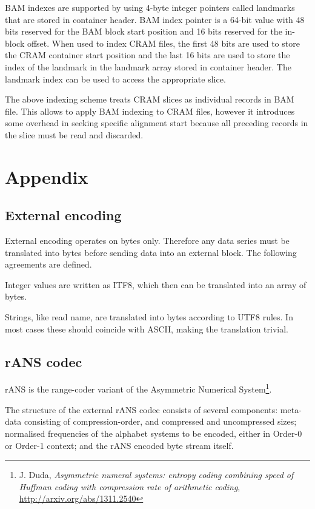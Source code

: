 \documentclass[a4paper]{article}
\begin{document}
BAM indexes are supported by using 4-byte integer pointers called landmarks that 
are stored in container header. BAM index pointer is a 64-bit value with 48 bits 
reserved for the BAM block start position and 16 bits reserved for the in-block 
offset. When used to index CRAM files, the first 48 bits are used to store the 
CRAM container start position and the last 16 bits are used to store the index 
of the landmark in the landmark array stored in  container header. The landmark 
index can be used to access the appropriate slice. 

The above indexing scheme treats CRAM slices as individual records in BAM file. 
This allows to apply BAM indexing to CRAM files, however it introduces some overhead 
in seeking specific alignment start because all preceding records in the slice 
must be read and discarded.

\section{\textbf{Appendix}}

\subsection{\textbf{External encoding}}

External encoding operates on bytes only. Therefore any data series must be translated 
into bytes before sending data into an external block. The following agreements 
are defined. 

Integer values are written as ITF8, which then can be translated into an array 
of bytes. 

Strings, like read name, are translated into bytes according to UTF8 rules. In 
most cases these should coincide with ASCII, making the translation trivial. 

\subsection{\textbf{rANS codec}}

rANS is the range-coder variant of the Asymmetric Numerical
System\footnote{J. Duda, \textit{Asymmetric numeral systems: entropy
    coding combining speed of Huffman coding with compression rate of
    arithmetic coding}, \url{http://arxiv.org/abs/1311.2540}}.

The structure of the external rANS codec consists of several
components: meta-data consisting of compression-order, and compressed
and uncompressed sizes; normalised frequencies of the alphabet systems
to be encoded, either in Order-0 or Order-1 context; and the rANS
encoded byte stream itself.
\end{document}
